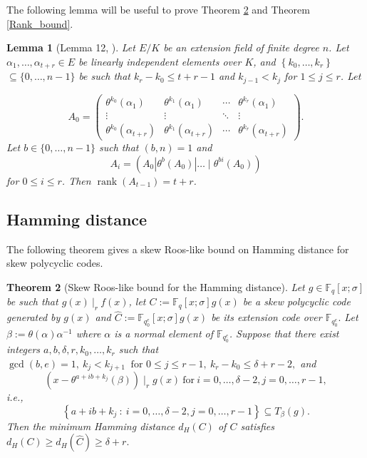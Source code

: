 \documentclass[12pt,paper]{article}
\theoremstyle{plain}
\newtheorem{theorem}{Theorem}[section] %
\newtheorem{lemma}[theorem]{Lemma} %
\newcommand{\Fq}{\mathbb{F}_{q}}
\DeclareMathOperator{\rank}{rank}
\begin{document}
The following lemma will be useful to prove Theorem \ref{thm:Roos} and Theorem \ref{Rank_bound}. 
\begin{lemma}[Lemma 12, \cite{Alfarano2021}]\label{Circulant_lemma}
Let $E/K$ be an extension field of finite degree $n$. Let $\alpha_1, \ldots, \alpha_{t+r} \in E$ be linearly independent elements over $K$, and  $\left\{k_0, \ldots, k_r\right\}$ $\subseteq\{0, \ldots, n-1\}$ be such that $k_r-k_0 \leq t+r-1$ and $k_{j-1}<k_j$ for $1 \leq j \leq r$. Let

$$
A_0=\left(\begin{array}{cccc}
\theta^{k_0}\left(\alpha_1\right) & \theta^{k_1}\left(\alpha_1\right) & \cdots & \theta^{k_r}\left(\alpha_1\right) \\
\vdots & \vdots & \ddots & \vdots \\
\theta^{k_0}\left(\alpha_{t+r}\right) & \theta^{k_1}\left(\alpha_{t+r}\right) & \cdots & \theta^{k_r}\left(\alpha_{t+r}\right)
\end{array}\right) .
$$
Let $b \in\{0, \ldots, n-1\}$ such that $(b, n)=1$ and
$$
A_i=\left(A_0\left|\theta^b\left(A_0\right)\right| \ldots \mid \theta^{b i}\left(A_0\right)\right)
$$
for $0 \leq i \leq r$. Then $\rank\left(A_{t-1}\right)=t+r$.
\end{lemma}


\subsection{Hamming distance}

The following theorem gives a skew Roos-like bound on Hamming distance for skew polycyclic codes.
    \begin{theorem}[Skew Roos-like bound for the Hamming distance]\label{thm:Roos}
    Let $g \in \Fq[x;\sigma]$ be such that $ g(x) ~|_r~ f(x)$, let $ C:= \Fq[x;\sigma] g(x)$ be a skew polycyclic code generated by $g(x)$ and $\widehat{C}:= \mathbb{F}_{q_0^e}[x;\sigma] g(x) $ be its extension code over $ \mathbb{F}_{q_0^e}.$
    Let $\beta:= \theta(\alpha)\alpha^{-1}$ where $\alpha$ is a normal element of $ \mathbb{F}_{q_0^e}$. 
    Suppose that there exist integers $ a, b, \delta, r, k_0, \dots , k_r$ such that $\gcd( b,e)=1,\  k_j<k_{j+1}\ \text { for } 0 \leq j \leq r-1, \ k_r-k_0 \leq \delta+r-2, $ and  
    $$ (x-{\theta^{a+ib+k_j}(\beta)}) \mid_r g(x)  ~\text{for}~ i=0,\ldots,{\delta-2}, j=0,\ldots, r-1,$$ 
    i.e., $$ \left\{ a+ib+k_j   ~:~ i=0,\ldots,{\delta-2}, j=0,\ldots, r-1 \right\} \subseteq T_{\beta}(g). $$ Then  the minimum Hamming distance $d_H(C)$ of  $C$ satisfies     $d_H(C)\geq   d_H(\widehat{C}) \geq {\delta}+{r}. $
\end{theorem}
\end{document}
